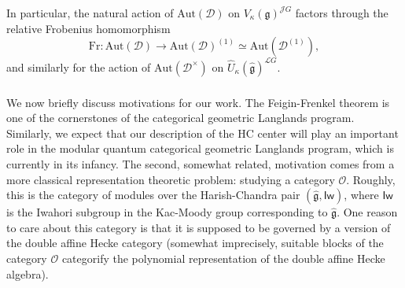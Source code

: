 \documentclass{amsart}
\theoremstyle{definition}
\newcommand{\sss}{\subsubsection{}}
\newcommand{\fg}{\mathfrak{g}}
\newcommand{\fr}{^\on{(1)}}
\newcommand{\D}{\sD}
\newcommand{\sD}{\mathscr{D}}
\newcommand{\on}{\mathrm}
\newcommand{\g}{\mathfrak{g}}
\newcommand{\hg}{\hat{\mathfrak{g}}}
\newcommand{\F}{\mathbb{F}}
\newcommand{\Jet}{\mathscr{J}}
\newcommand{\Loop}{\mathscr{L}}
\newcommand{\pD}{\sD^\times}
\newcommand{\Aut}{\on{Aut}}
\newcommand{\sO}{\mathscr{O}}
\numberwithin{equation}{section}
\begin{document}
{In particular, the natural action of $\Aut(\sD)$ on $V_\kappa(\fg)^{\Jet G}$ factors through the relative Frobenius homomorphism 
$$\on{Fr}: \Aut(\sD) \rightarrow \Aut(\sD)\fr \simeq \Aut(\sD\fr),$$and similarly for the action of $\Aut(\pD)$ on $\widehat{U}_\kappa(\hat{\fg})^{\Loop G}$. 

}

\sss We now briefly discuss motivations for our work. 
The Feigin-Frenkel theorem is one of the cornerstones of the categorical geometric Langlands program. Similarly, we expect that our description of the HC center will play an important role in the modular quantum categorical geometric Langlands program, which is currently in its infancy. The second, somewhat related, motivation comes from a more classical representation theoretic problem: studying a category $\sO$. Roughly, this is the category of modules over the Harish-Chandra pair $(\hg, \mathsf{Iw})$, where $\mathsf{Iw}$ 
is the Iwahori subgroup in the Kac-Moody group corresponding to $\hg$. One reason to care about this category is that it is supposed to be governed by a version of the double affine Hecke category (somewhat imprecisely, suitable blocks of the category $\sO$ categorify the polynomial representation of the double affine Hecke algebra). 

\end{document}
